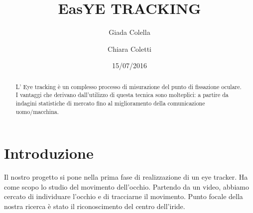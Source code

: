 \documentclass[12pt]{article}
\title{\textbf{EasYE TRACKING}}
\author{Giada Colella \and Chiara Coletti}
\date{15/07/2016}
\begin{document}
	
\maketitle
\pagebreak

\tableofcontents

\pagebreak

\begin{abstract}
	L' Eye tracking è un complesso processo di misurazione del punto di fissazione oculare. I vantaggi che derivano dall'utilizzo di questa tecnica sono molteplici: a partire da indagini statistiche di mercato fino al miglioramento della comunicazione uomo/macchina.
\end{abstract}
\pagebreak
\section{Introduzione}
Il nostro progetto si pone nella prima fase di realizzazione di un eye tracker. Ha come scopo lo studio del movimento dell'occhio. Partendo da un video, abbiamo cercato di individuare l'occhio e di tracciarne il movimento. Punto focale della nostra ricerca è stato il riconoscimento del centro dell'iride. 
\end{document}
